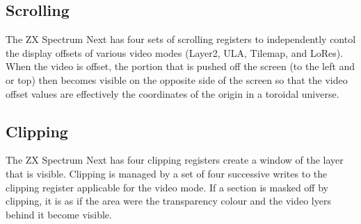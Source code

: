 \subsection{Scrolling}
The ZX Spectrum Next has four sets of scrolling registers to
independently contol the display offsets of various video modes
(Layer2, ULA, Tilemap, and LoRes). When the video is offset, the
portion that is pushed off the screen (to the left and or top) then
becomes visible on the opposite side of the screen so that the video
offset values are effectively the coordinates of the origin in a
toroidal universe.

\subsection{Clipping}
The ZX Spectrum Next has four clipping registers create a window of
the layer that is visible. Clipping is managed by a set of four
successive writes to the clipping register applicable for the video
mode. If a section is masked off by clipping, it is as if the area
were the transparency colour and the video lyers behind it become
visible.
